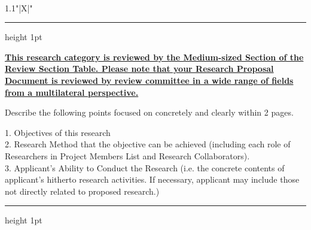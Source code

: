 \documentclass[8pt]{extarticle}
\makeatletter
\newcommand{\thickhline}{%
	\noalign {\ifnum 0=`}\fi \hrule height 1pt
	\futurelet \reserved@a \@xhline
}
\makeatother
\begin{document}
	
\noindent\textbf{\fontsize{12}{12}\selectfont {}}\\
\begin{tabularx}{1.1\linewidth}{"|X|"}
	\thickhline
	\underline{\textbf{This research category is reviewed by the Medium-sized Section of the Review Section Table. 
	Please note that your Research Proposal}}\\ 
	\underline{\textbf{Document is reviewed by review committee in a wide range of fields from a multilateral perspective.}}
	
	Describe the following points focused on concretely and clearly within 2 pages.
	
	1. Objectives of this research\\
	2. Research Method that the objective can be achieved (including each role of Researchers in Project Members List and Research Collaborators).\\
	3. Applicant's Ability to Conduct the Research (i.e. the concrete contents of applicant's hitherto research activities. If necessary, applicant may include those not directly related to proposed research.) 
	\\
	\thickhline
\end{tabularx}
\end{document}
